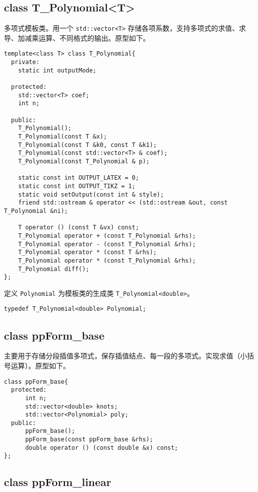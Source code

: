 \documentclass[lang=cn,11pt,a4paper]{elegantpaper}
\begin{document}
\subsection{class T\_Polynomial<T>}

多项式模板类。用一个 \verb|std::vector<T>| 存储各项系数，支持多项式的求值、求导、加减乘运算、不同格式的输出。原型如下。

\begin{lstlisting}
template<class T> class T_Polynomial{
  private:
    static int outputMode;

  protected:
    std::vector<T> coef;
    int n;

  public:
    T_Polynomial();
    T_Polynomial(const T &x);
    T_Polynomial(const T &k0, const T &k1);
    T_Polynomial(const std::vector<T> & coef);
    T_Polynomial(const T_Polynomial & p);

    static const int OUTPUT_LATEX = 0;
    static const int OUTPUT_TIKZ = 1;
    static void setOutput(const int & style);
    friend std::ostream & operator << (std::ostream &out, const T_Polynomial &ni);
    
    T operator () (const T &vx) const;
    T_Polynomial operator + (const T_Polynomial &rhs);
    T_Polynomial operator - (const T_Polynomial &rhs);
    T_Polynomial operator * (const T &rhs);
    T_Polynomial operator * (const T_Polynomial &rhs);
    T_Polynomial diff();
};
\end{lstlisting}

定义 \verb|Polynomial| 为模板类的生成类 \verb|T_Polynomial<double>|。

\begin{lstlisting}
typedef T_Polynomial<double> Polynomial;
\end{lstlisting}

\subsection{class ppForm\_base}

主要用于存储分段插值多项式，保存插值结点、每一段的多项式。实现求值（小括号运算）。原型如下。

\begin{lstlisting}
class ppForm_base{
  protected:
      int n;
      std::vector<double> knots;
      std::vector<Polynomial> poly;
  public:
      ppForm_base();
      ppForm_base(const ppForm_base &rhs);
      double operator () (const double &x) const;
};
\end{lstlisting}

\subsection{class ppForm\_linear}
\end{document}
